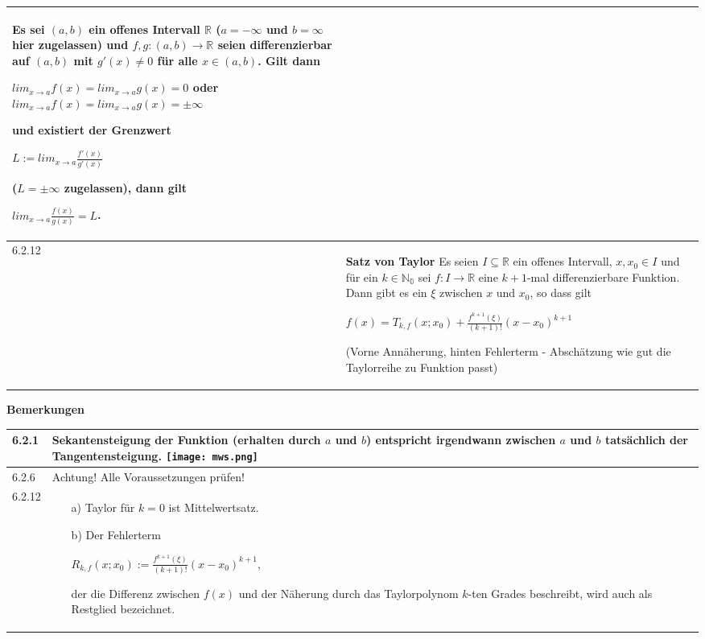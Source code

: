 \begin{table}[H]
\begin{tabularx}{\textwidth}{X m{16cm}}
                Es sei $(a,b)$ ein offenes Intervall $\mathbb{R}$ ($a= - \infty$ und $b = \infty$ hier zugelassen)  und $f,g:
                (a,b) \rightarrow \mathbb{R}$ seien differenzierbar auf $(a,b)$ mit $g'(x) \neq 0$ für alle $x \in (a,b)$. Gilt dann
                \hfill \break
                \centerline{$lim_{x \rightarrow a} f(x) = lim_{x \rightarrow a} g(x) = 0$ oder $lim_{x \rightarrow a} f(x) = 
                lim_{x \rightarrow a} g(x) = \pm \infty$} 
                und existiert der Grenzwert \hfill \break
                \centerline{$ L := lim_{x \rightarrow a} \frac{f'(x)}{g'(x)} $} 
                ($L = \pm \infty$ zugelassen), dann gilt \hfill \break
                \centerline{$lim_{x \rightarrow a} \frac{f(x)}{g(x)} = L$.}\\
        \midrule
        6.2.12& \textbf{Satz von Taylor} \hfill \break
                Es seien $I \subseteq \mathbb{R}$ ein offenes Intervall, $x,x_0 \in I$ und für ein $k \in \mathbb{N_0}$ sei $f:I \rightarrow \mathbb{R}$
                eine $k+1$-mal differenzierbare Funktion. Dann gibt es ein $\xi$ zwischen $x$ und $x_0$, so dass gilt \hfill \break
                \centerline{$ f(x) = T_{k,f}(x;x_0) + \frac{f^{k+1}(\xi)}{(k+1)!} (x-x_0)^{k+1} $} 
                (Vorne Annäherung, hinten Fehlerterm - Abschätzung wie gut die Taylorreihe zu Funktion passt) \\

        \bottomrule
    \end{tabularx}
    \end{table}

    \noindent
    \textbf{Bemerkungen}
    \begin{table}[H]
    \begin{tabularx}{\textwidth}{X m{16cm}}
        \toprule

        6.2.1 & Sekantensteigung der Funktion (erhalten durch $a$ und $b$) entspricht irgendwann zwischen $a$ und $b$ tatsächlich
                der Tangentensteigung. \hfill \break
                \texttt{[image: mws.png]} \\
        \midrule
        6.2.6 & Achtung! Alle Voraussetzungen prüfen! \\
        \midrule
        6.2.12& \begin{itemize}
                    \item[a)] Taylor für $k=0$ ist Mittelwertsatz.
                    \item[b)] Der Fehlerterm \hfill \break
                                \centerline{$ R_{k,f}(x;x_0) := \frac{f^{k+1}(\xi)}{(k+1)!}(x-x_0)^{k+1}$,}
                                der die Differenz zwischen $f(x)$ und der Näherung durch das Taylorpolynom $k$-ten Grades beschreibt,
                                wird auch als Restglied bezeichnet.
                \end{itemize} \\


        \bottomrule
    \end{tabularx}
    \end{table}

